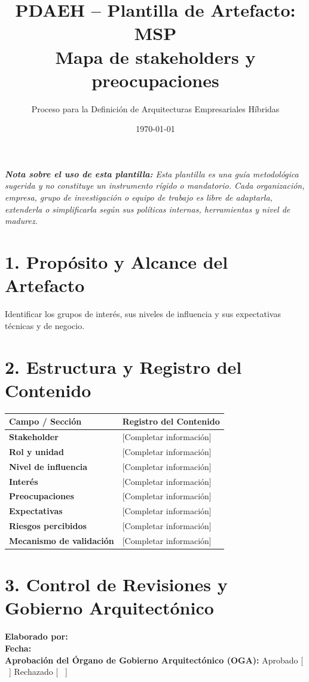 \documentclass[11pt,a4paper]{article}
\title{\textbf{\color{brandgreen} PDAEH -- Plantilla de Artefacto: MSP} \\[0.3em] \large Mapa de stakeholders y preocupaciones}
\author{Proceso para la Definición de Arquitecturas Empresariales Híbridas}
\date{\today}
\begin{document}
\maketitle

\noindent \textit{\textbf{Nota sobre el uso de esta plantilla:} Esta plantilla es una guía metodológica sugerida y no constituye un instrumento rígido o mandatorio. Cada organización, empresa, grupo de investigación o equipo de trabajo es libre de adaptarla, extenderla o simplificarla según sus políticas internas, herramientas y nivel de madurez.}

\section*{1. Propósito y Alcance del Artefacto}
Identificar los grupos de interés, sus niveles de influencia y sus expectativas técnicas y de negocio.

\section*{2. Estructura y Registro del Contenido}
\begin{tabularx}{\textwidth}{|>{\bfseries}p{4.5cm}|X|}
    \hline
    \rowcolor[gray]{0.92} Campo / Sección & Registro del Contenido \\ \hline
    \textbf{Stakeholder} & [Completar información] \\ \hline
    \textbf{Rol y unidad} & [Completar información] \\ \hline
    \textbf{Nivel de influencia} & [Completar información] \\ \hline
    \textbf{Interés} & [Completar información] \\ \hline
    \textbf{Preocupaciones} & [Completar información] \\ \hline
    \textbf{Expectativas} & [Completar información] \\ \hline
    \textbf{Riesgos percibidos} & [Completar información] \\ \hline
    \textbf{Mecanismo de validación} & [Completar información] \\ \hline
\end{tabularx}

\vspace{1.2cm}
\section*{3. Control de Revisiones y Gobierno Arquitectónico}
\noindent \textbf{Elaborado por:} \hrulefill \\[0.5em]
\textbf{Fecha:} \hrulefill \\[0.5em]
\textbf{Aprobación del Órgano de Gobierno Arquitectónico (OGA):} Aprobado [ \, ] \quad Rechazado [ \, ]
\end{document}
